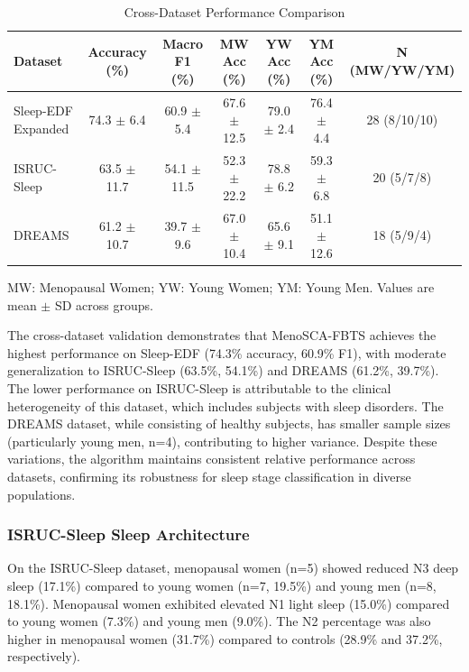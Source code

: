 \documentclass[a4paper,fleqn]{cas-dc}
\begin{document}
\begin{table}[!ht]
\centering
\caption{Cross-Dataset Performance Comparison}
\label{tab:cross_dataset}
\begin{tabular*}{\textwidth}{@{\extracolsep\fill}lcccccc@{\extracolsep\fill}}
\toprule
\textbf{Dataset} & \textbf{Accuracy (\%)} & \textbf{Macro F1 (\%)} & \textbf{MW Acc (\%)} & \textbf{YW Acc (\%)} & \textbf{YM Acc (\%)} & \textbf{N (MW/YW/YM)} \\
\midrule
Sleep-EDF Expanded & 74.3 $\pm$ 6.4 & 60.9 $\pm$ 5.4 & 67.6 $\pm$ 12.5 & 79.0 $\pm$ 2.4 & 76.4 $\pm$ 4.4 & 28 (8/10/10) \\
ISRUC-Sleep & 63.5 $\pm$ 11.7 & 54.1 $\pm$ 11.5 & 52.3 $\pm$ 22.2 & 78.8 $\pm$ 6.2 & 59.3 $\pm$ 6.8 & 20 (5/7/8) \\
DREAMS & 61.2 $\pm$ 10.7 & 39.7 $\pm$ 9.6 & 67.0 $\pm$ 10.4 & 65.6 $\pm$ 9.1 & 51.1 $\pm$ 12.6 & 18 (5/9/4) \\
\bottomrule
\end{tabular*}
\begin{tablenotes}
\small
\item MW: Menopausal Women; YW: Young Women; YM: Young Men. Values are mean $\pm$ SD across groups.
\end{tablenotes}
\end{table}

The cross-dataset validation demonstrates that MenoSCA-FBTS achieves the highest performance on Sleep-EDF (74.3\% accuracy, 60.9\% F1), with moderate generalization to ISRUC-Sleep (63.5\%, 54.1\%) and DREAMS (61.2\%, 39.7\%). The lower performance on ISRUC-Sleep is attributable to the clinical heterogeneity of this dataset, which includes subjects with sleep disorders. The DREAMS dataset, while consisting of healthy subjects, has smaller sample sizes (particularly young men, n=4), contributing to higher variance. Despite these variations, the algorithm maintains consistent relative performance across datasets, confirming its robustness for sleep stage classification in diverse populations.

\subsubsection{ISRUC-Sleep Sleep Architecture}

On the ISRUC-Sleep dataset, menopausal women (n=5) showed reduced N3 deep sleep (17.1\%) compared to young women (n=7, 19.5\%) and young men (n=8, 18.1\%). Menopausal women exhibited elevated N1 light sleep (15.0\%) compared to young women (7.3\%) and young men (9.0\%). The N2 percentage was also higher in menopausal women (31.7\%) compared to controls (28.9\% and 37.2\%, respectively).
\end{document}
